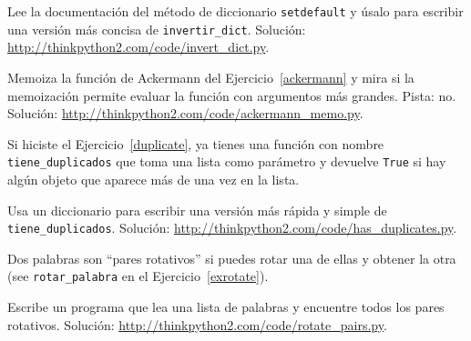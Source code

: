 \documentclass[10pt]{book}
\begin{document}
\begin{exercise}
\label{setdefault}

Lee la documentación del método de diccionario {\tt setdefault}
y úsalo para escribir una versión más concisa de \verb"invertir_dict".
Solución: \url{http://thinkpython2.com/code/invert_dict.py}.

\end{exercise}


\begin{exercise}
Memoiza la función de Ackermann del Ejercicio~\ref{ackermann} y mira si
la memoización permite evaluar la función con argumentos
más grandes.  Pista: no.
Solución: \url{http://thinkpython2.com/code/ackermann_memo.py}.

\end{exercise}



\begin{exercise}

Si hiciste el Ejercicio~\ref{duplicate}, ya tienes
una función con nombre \verb"tiene_duplicados" que toma una lista
como parámetro y devuelve {\tt True} si hay algún objeto
que aparece más de una vez en la lista.

Usa un diccionario para escribir una versión más rápida y simple de
\verb"tiene_duplicados".
Solución: \url{http://thinkpython2.com/code/has_duplicates.py}.

\end{exercise}


\begin{exercise}
\label{exrotatepairs}

Dos palabras son ``pares rotativos'' si puedes rotar una de ellas
y obtener la otra (see \verb"rotar_palabra" en el Ejercicio~\ref{exrotate}).

Escribe un programa que lea una lista de palabras y encuentre todos los pares
rotativos.  Solución: \url{http://thinkpython2.com/code/rotate_pairs.py}.

\end{exercise}
\end{document}
